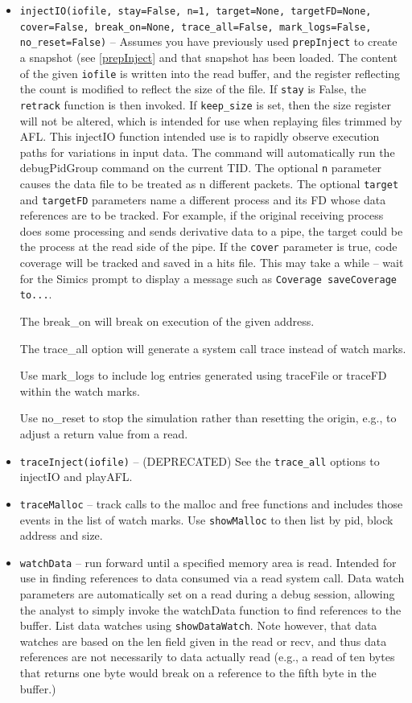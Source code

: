 \documentclass[titlepage]{article}
\begin{document}
\begin{itemize}
\item {\tt injectIO(iofile, stay=False, n=1, target=None, targetFD=None, cover=False, break\_on=None, trace\_all=False, mark\_logs=False, no\_reset=False)} -- Assumes you have previously used {\tt prepInject}
to create a snapshot (see \ref{prepInject} and that snapshot has been loaded.
The content of the given {\tt iofile} is written into the read buffer, and the register reflecting 
the count is modified to reflect the size of the file.  If {\tt stay} is False, the {\tt retrack} function is then invoked. If {\tt keep\_size} is
set, then the size register will not be altered, which is intended for use when replaying files trimmed by AFL.
This injectIO function intended use is to rapidly observe execution paths for variations in input data. The command will automatically
run the debugPidGroup command on the current TID. The optional {\tt n} parameter causes the data file to be treated as n different packets.
The optional {\tt target} and {\tt targetFD} parameters name a different process and its FD whose data references are to be tracked.  For example,
if the original receiving process does some processing and sends derivative data to a pipe, the target could be the process at the read side
of the pipe.  If the {\tt cover} parameter is true, code coverage will be tracked and saved in a hits file.  This may take a while -- wait for the
Simics prompt to display a message such as {\tt Coverage saveCoverage to...}.

The break\_on will break on execution of the given address. 

The trace\_all option will generate a system call trace instead of watch marks.

Use mark\_logs to include log entries generated using traceFile or traceFD within the watch marks.

Use no\_reset to stop the simulation rather than resetting the origin, e.g., to adjust a return value from a read.

\item {\tt traceInject(iofile)} -- (DEPRECATED) See the {\tt trace\_all} options to injectIO and playAFL.

\item{\tt traceMalloc} -- track calls to the malloc and free functions and includes those events in the list of watch marks. Use {\tt showMalloc} to 
then list by pid, block address and size.

\item {\tt watchData} – run forward until a specified memory area is read.  Intended for use in finding references to data consumed via a read system call.  Data watch parameters are automatically set on a read during a debug session, allowing the analyst to simply invoke the watchData function to find references to the buffer.  List data watches using {\tt showDataWatch}.
Note however, that data watches are based on the len field given in the read or recv, and thus data references are not necessarily to data actually read (e.g., a read of ten bytes
that returns one byte would break on a reference to the fifth byte in the buffer.)

\end{itemize}
\end{document}
